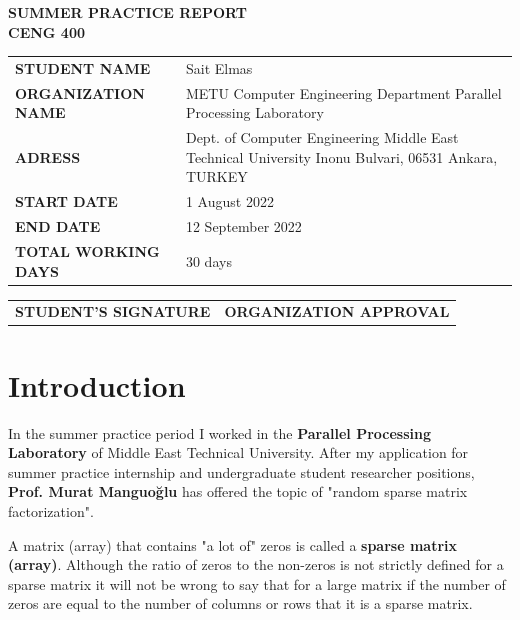 \documentclass[11pt,a4paper]{article}
\theoremstyle{definition}
\begin{document}
\begin{titlepage}
		\begin{center}
			\huge
			\textbf{SUMMER PRACTICE REPORT \\ CENG 400 \\}
			\vspace{2cm}
		\end{center}
	
		\large
		\begingroup
		\renewcommand{\arraystretch}{2.0} %
		\begin{tabular}{ p{5.6cm} p{10cm} }
			\textbf{STUDENT NAME} & Sait Elmas \\
			\textbf{ORGANIZATION NAME} & METU Computer Engineering Department Parallel Processing Laboratory \\
			\textbf{ADRESS} & Dept. of Computer Engineering Middle East Technical University Inonu Bulvari, 06531 Ankara, TURKEY \\
			\textbf{START DATE} & 1 August 2022 \\
			\textbf{END DATE} & 12 September 2022\\
			\textbf{TOTAL WORKING DAYS} & 30 days \\
		\end{tabular}
		\vspace{2cm}
		\endgroup

		\begin{tabular}{p{9cm} p{9cm}}
			\textbf{STUDENT'S SIGNATURE} & \textbf{ORGANIZATION APPROVAL} \\
		\end{tabular}
		
	\end{titlepage}
	
	\tableofcontents
	\newpage
	
	\section{Introduction}
		
		In the summer practice period I worked in the \textbf{Parallel Processing Laboratory} of Middle East Technical University. After my application for summer practice internship and undergraduate student researcher positions, \textbf{Prof. Murat Manguoğlu} has offered the topic of "random sparse matrix factorization".
		
		A matrix (array) that contains "a lot of" zeros is called a \textbf{sparse matrix (array)}. Although the ratio of zeros to the non-zeros is not strictly defined for a sparse matrix it will not be wrong to say that for a large matrix if the number of zeros are equal to the number of columns or rows that it is a sparse matrix. 
		
\end{document}
